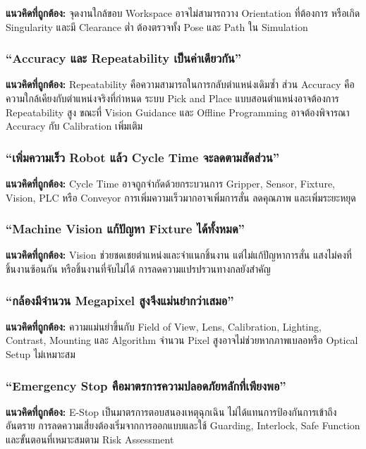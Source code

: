 \textbf{แนวคิดที่ถูกต้อง:} จุดงานใกล้ขอบ Workspace อาจไม่สามารถวาง Orientation ที่ต้องการ หรือเกิด Singularity และมี Clearance ต่ำ ต้องตรวจทั้ง Pose และ Path ใน Simulation

\subsubsection{“Accuracy และ Repeatability เป็นค่าเดียวกัน”}

\textbf{แนวคิดที่ถูกต้อง:} Repeatability คือความสามารถในการกลับตำแหน่งเดิมซ้ำ ส่วน Accuracy คือความใกล้เคียงกับตำแหน่งจริงที่กำหนด ระบบ Pick and Place แบบสอนตำแหน่งอาจต้องการ Repeatability สูง ขณะที่ Vision Guidance และ Offline Programming อาจต้องพิจารณา Accuracy กับ Calibration เพิ่มเติม

\subsubsection{“เพิ่มความเร็ว Robot แล้ว Cycle Time จะลดตามสัดส่วน”}

\textbf{แนวคิดที่ถูกต้อง:} Cycle Time อาจถูกจำกัดด้วยกระบวนการ Gripper, Sensor, Fixture, Vision, PLC หรือ Conveyor การเพิ่มความเร็วมากอาจเพิ่มการสั่น ลดคุณภาพ และเพิ่มระยะหยุด

\subsubsection{“Machine Vision แก้ปัญหา Fixture ได้ทั้งหมด”}

\textbf{แนวคิดที่ถูกต้อง:} Vision ช่วยชดเชยตำแหน่งและจำแนกชิ้นงาน แต่ไม่แก้ปัญหาการสั่น แสงไม่คงที่ ชิ้นงานซ้อนกัน หรือชิ้นงานที่จับไม่ได้ การลดความแปรปรวนทางกลยังสำคัญ

\subsubsection{“กล้องมีจำนวน Megapixel สูงจึงแม่นยำกว่าเสมอ”}

\textbf{แนวคิดที่ถูกต้อง:} ความแม่นยำขึ้นกับ Field of View, Lens, Calibration, Lighting, Contrast, Mounting และ Algorithm จำนวน Pixel สูงอาจไม่ช่วยหากภาพเบลอหรือ Optical Setup ไม่เหมาะสม

\subsubsection{“Emergency Stop คือมาตรการความปลอดภัยหลักที่เพียงพอ”}

\textbf{แนวคิดที่ถูกต้อง:} E-Stop เป็นมาตรการตอบสนองเหตุฉุกเฉิน ไม่ได้แทนการป้องกันการเข้าถึงอันตราย การลดความเสี่ยงต้องเริ่มจากการออกแบบและใช้ Guarding, Interlock, Safe Function และขั้นตอนที่เหมาะสมตาม Risk Assessment

